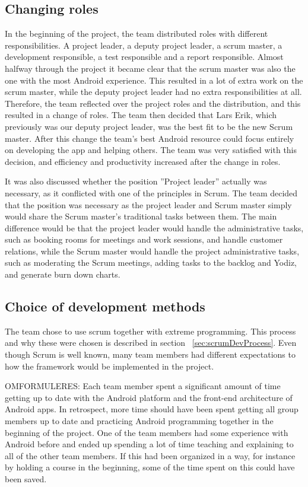 \subsection{Changing roles}
\label{sec:unbalancedWorkload}
In the beginning of the project, the team distributed roles with different responsibilities. A project leader, a deputy project leader, a scrum master, a development responsible, a test responsible and a report responsible. Almost halfway through the project it became clear that the scrum master was also the one with the most Android experience. This resulted in a lot of extra work on the scrum master, while the deputy project leader had no extra responsibilities at all. Therefore, the team reflected over the project roles and the distribution, and this resulted in a change of roles. The team then decided that Lars Erik, which previously was our deputy project leader, was the best fit to be the new Scrum master. After this change the team's best Android resource could focus entirely on developing the app and helping others. The team was very satisfied with this decision, and efficiency and productivity increased after the change in roles.

It was also discussed whether the position ''Project leader'' actually was necessary, as it conflicted with one of the principles in Scrum. The team decided that the position was necessary as the project leader and Scrum master simply would share the Scrum master's traditional tasks between them. The main difference would be that the project leader would handle the administrative tasks, such as booking rooms for meetings and work sessions, and handle customer relations, while the Scrum master would handle the project administrative tasks, such as moderating the Scrum meetings, adding tasks to the backlog and Yodiz, and generate burn down charts.

\subsection{Choice of development methods}

The team chose to use scrum together with extreme programming. This process and why these were chosen is described in section ~\ref{sec:scrumDevProcess}. Even though Scrum is well known, many team members had different expectations to how the framework would be implemented in the project.


OMFORMULERES: Each team member spent a significant amount of time getting up to date with the Android platform and the front-end architecture of Android apps. In retrospect, more time should have been spent getting all group members up to date and practicing Android programming together in the beginning of the project. One of the team members had some experience with Android before and ended up spending a lot of time teaching and explaining to all of the other team members. If this had been organized in a way, for instance by holding a course in the beginning, some of the time spent on this could have been saved. 

